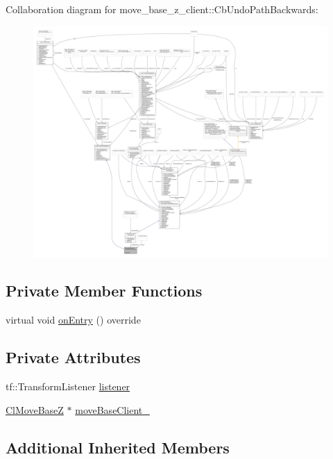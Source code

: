 Collaboration diagram for move\+\_\+base\+\_\+z\+\_\+client\+:\+:Cb\+Undo\+Path\+Backwards\+:
\nopagebreak
\begin{figure}[H]
\begin{center}
\leavevmode
\includegraphics[width=350pt]{classmove__base__z__client_1_1CbUndoPathBackwards__coll__graph}
\end{center}
\end{figure}
\subsection*{Private Member Functions}
\begin{DoxyCompactItemize}
\item 
virtual void \hyperlink{classmove__base__z__client_1_1CbUndoPathBackwards_a171b0d1a2943f5aca0647b101695eb71}{on\+Entry} () override
\end{DoxyCompactItemize}
\subsection*{Private Attributes}
\begin{DoxyCompactItemize}
\item 
tf\+::\+Transform\+Listener \hyperlink{classmove__base__z__client_1_1CbUndoPathBackwards_a197e2034e873c09de896e7a8b6fe898f}{listener}
\item 
\hyperlink{classmove__base__z__client_1_1ClMoveBaseZ}{Cl\+Move\+BaseZ} $\ast$ \hyperlink{classmove__base__z__client_1_1CbUndoPathBackwards_a19e7ace85698725a1d2730a7c6b3aa7d}{move\+Base\+Client\+\_\+}
\end{DoxyCompactItemize}
\subsection*{Additional Inherited Members}


